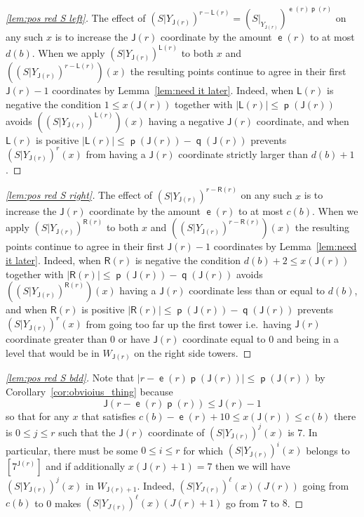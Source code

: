 \documentclass[AHL,Unicode,longabstracts,published]{cedram}
\DeclareMathOperator{\lst}{\mathsf{e}}
\DeclareMathOperator{\p}{\mathsf{p}}
\DeclareMathOperator{\q}{\mathsf{q}}
\newcommand{\lft}{\mathsf{L}}
\newcommand{\rht}{\mathsf{R}}
\newcommand{\scl}{\mathsf{J}}
\begin{document}
\begin{proofc}
\begin{proof}[{\eqref{lem:pos red S left}}]
The effect of $(S|Y_{\scl(r)})^{r -
\lft(r)}=(S|_{Y_{\scl(r)}})^{\lst(r)\p(r)}$ on any such $x$ is to increase the $\scl(r)$ coordinate by the amount $\lst(r)$ to at most $d(b)$. When we apply $(S|Y_{\scl(r)})^{\lft(r)}$ to both $x$ and $((S|Y_{\scl(r)})^{r -
\lft(r)})(x)$ the resulting points continue to agree in their first $\scl(r) - 1$ coordinates by Lemma~\ref{lem:need it later}. Indeed, when $\lft(r)$ is negative the condition $1 \le x(\scl(r))$ together with $|\lft(r)| \le
\p(\scl(r))$ avoids $((S|Y_{\scl(r)})^{\lft(r)})(x)$ having a negative $\scl(r)$ coordinate, and when $\lft(r)$ is positive $|\lft(r)| \le
\p(\scl(r)) - \q(\scl(r))$ prevents $(S|Y_{\scl(r)})^r(x)$ from having a $\scl(r)$ coordinate strictly larger than $ d(b) + 1$.\let\qed\relax
\end{proof}

\begin{proof}[{\eqref{lem:pos red S right}}]
The effect of $(S|Y_{\scl(r)})^{r - \rht(r)}$ on any such $x$ is to increase the $\scl(r)$ coordinate by the amount $\lst(r)$ to at most $c(b)$. When we apply $(S|Y_{\scl(r)})^{\rht(r)}$ to both $x$ and $((S|Y_{\scl(r)})^{r - \rht(r)})(x)$ the resulting points continue to agree in their first $\scl(r) - 1$ coordinates by Lemma~\ref{lem:need it later}. Indeed, when $\rht(r)$ is negative the condition $d(b) + 2 \le x(\scl(r))$ together with $|\rht(r)| \le \p(\scl(r)) - \q(\scl(r))$ avoids $((S|Y_{\scl(r)})^{\rht(r)})(x)$ having a $\scl(r)$ coordinate less than or equal to $d(b)$, and when $\rht(r)$ is positive $|\rht(r)| \le \p(\scl(r)) - \q(\scl(r))$ prevents $(S|Y_{\scl(r)})^r(x)$ from going too far up the first tower i.e.\ having $\scl(r)$ coordinate greater than 0 or have $\scl(r)$ coordinate equal to 0 and being in a level that would be in $W_{\scl(r)}$ on the right side towers.
\let\qed\relax
\end{proof}

\begin{proof}[{\eqref{lem:pos red S bdd}}]
Note that $|r - \lst(r) \p(\scl(r))| \le
\p(\scl(r))$ by Corollary~\ref{cor:obvioius_thing} because
\[
\scl(r - \lst(r) \p(r)) \le \scl(r) - 1
\]
so that for any $x$ that satisfies $c(b) - \lst(r) + 10 \le x(\scl(r)) \le c(b)$ there is $0 \le j \le r$ such that the $\scl(r)$ coordinate of $(S|Y_{\scl(r)})^j(x)$ is $7$. In particular, there must be some $0 \le i \le r$ for which $(S|Y_{\scl(r)})^i(x)$ belongs to $[7^{\scl(r)}]$ and if additionally $x(\scl(r) + 1) = 7$ then we will have $(S|Y_{\scl(r)})^j(x)$ in $W_{\scl(r)+1}$. Indeed, $(S|Y_{J(r)})^\ell (x)(J(r))$ going from $c(b)$ to 0 makes $(S|Y_{J(r)})^\ell (x)(J(r)+1)$ go from $7$ to $8$.
\end{proof}\let\qed\relax
\end{proofc}
\end{document}
